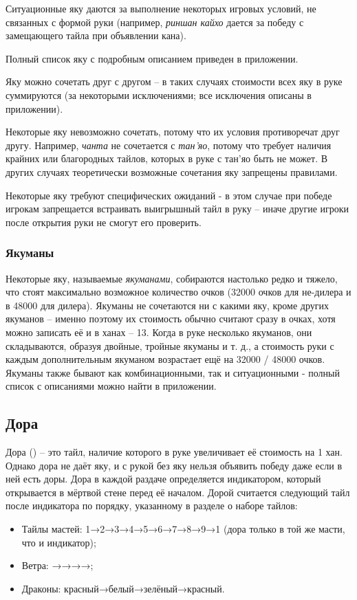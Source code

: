 Ситуационные яку даются за выполнение некоторых игровых условий, не связанных с формой руки (например, \textit{риншан кайхо} дается за победу с замещающего тайла при объявлении кана).

Полный список яку с подробным описанием приведен в приложении.

Яку можно сочетать друг с другом – в таких случаях стоимости всех яку в руке суммируются (за некоторыми исключениями; все исключения описаны в приложении).

Некоторые яку невозможно сочетать, потому что их условия противоречат друг другу. Например, \textit{чанта} не сочетается с \textit{тан'яо}, потому что требует наличия крайних или благородных тайлов, которых в руке с тан'яо быть не может. В других случаях теоретически возможные сочетания яку запрещены правилами.

Некоторые яку требуют специфических ожиданий - в этом случае при победе игрокам запрещается встраивать выигрышный тайл в руку – иначе другие игроки после открытия руки не смогут его проверить.

\subsubsection{Якуманы}

Некоторые яку, называемые \textit{якуманами}, собираются настолько редко и тяжело, что стоят максимально возможное количество очков (32000 очков для не-дилера и в 48000 для дилера). Якуманы не сочетаются ни с какими яку, кроме других якуманов – именно поэтому их стоимость обычно считают сразу в очках, хотя можно записать её и в ханах – 13. Когда в руке несколько якуманов, они складываются, образуя двойные, тройные якуманы и т. д., а стоимость руки с каждым дополнительным якуманом возрастает ещё на 32000 / 48000 очков. Якуманы также бывают как комбинационными, так и ситуационными - полный список с описаниями можно найти в приложении.

\subsection{Дора}

Дора () – это тайл, наличие которого в руке увеличивает её стоимость на 1 хан. Однако дора не даёт яку, и с рукой без яку нельзя объявить победу даже если в ней есть доры. Дора в каждой раздаче определяется индикатором, который открывается в мёртвой стене перед её началом. Дорой считается следующий тайл после индикатора по порядку, указанному в разделе о наборе тайлов:
\begin{itemize}
	\item Тайлы мастей: 1→2→3→4→5→6→7→8→9→1 (дора только в той же масти, что и индикатор);
	\item Ветра: →→→→;
	\item Драконы: красный→белый→зелёный→красный.
\end{itemize}

